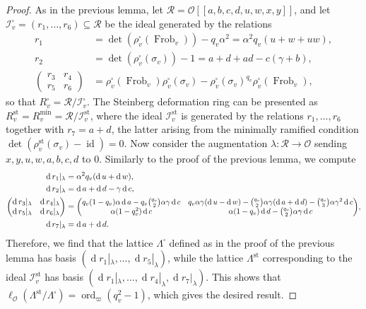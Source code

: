 \documentclass[a4paper, notitlepage, 10pt]{amsart}
\theoremstyle{plain} %
\theoremstyle{definition} %
\theoremstyle{remark} %
\numberwithin{equation}{section}
\newcommand{\dd}{\operatorname{d}} %
\newcommand{\Frob}{\operatorname{Frob}} %
\newcommand{\id}{\operatorname{id}} %
\newcommand{\ord}{\operatorname{ord}} %
\newcommand{\st}{\operatorname{st}}
\begin{document}
\begin{proof}
As in the previous lemma, let $\mathcal{R}=\mathcal{O}[[a,b,c,d,u,w,x,y]]$, and let $\mathcal{I}^\square_v=(r_1,\dots,r_6)\subseteq \mathcal{R}$ be the ideal generated by the relations    \begin{align*}
        r_1 &=\det(\rho_v^{\square}(\Frob_v))-q_v\alpha^2= \alpha^2q_v (u+w+uw),
        \\  r_2 &=\det(\rho_v^{\square}(\sigma_v))-1= a+d+ ad-c(\gamma+b),
        \\ \begin{pmatrix}
            r_3 & r_4
            \\ r_5 & r_6
        \end{pmatrix} &=\rho_v^{\square}(\Frob_v)\rho_v^{\square}(\sigma_v)-\rho_v^{\square}(\sigma_v)^{q_v} \rho_v^{\square}(\Frob_v),
    \end{align*}
    so that $R_v^\square= \mathcal{R}/\mathcal{I}^\square_v$. The Steinberg deformation ring can be presented as $R^{\st}_v=R^{\min}_v=\mathcal{R}/\mathcal{I}^{\st}_v$, where the ideal $\mathcal{I}^{\st}_v$ is generated by the relations $r_1,\dots,r_6$ together with $r_7=a+d$, the latter arising from the minimally ramified condition $\det(\rho^{\st}_v(\sigma_v)-\id)=0$.
    Now consider the augmentation $\lambda\colon \mathcal{R}\to \mathcal{O}$ sending $x,y,u,w,a,b,c,d$ to $0$. Similarly to the proof of the previous lemma, we compute
\begin{align*}
    \dd r_1|_\lambda &= \alpha^2 q_v (\dd u + \dd w),
    \\ \dd r_2|_\lambda &= \dd a+ \dd d -\gamma \dd c,
    \\ \begin{pmatrix}
        \dd r_3|_\lambda & \dd r_4|_\lambda
        \\ \dd r_5|_\lambda & \dd r_6|_\lambda
    \end{pmatrix} &= \scalebox{0.95}{$\begin{pmatrix}
        q_v(1-q_v)\alpha\dd a-q_v\tbinom{q_v}{2}\alpha\gamma \dd c 
        & q_v\alpha\gamma (\dd u-\dd w) -\tbinom{q_v}{2}\alpha\gamma (\dd a+\dd d) -\tbinom{q_v}{3}\alpha\gamma^2\dd c
        \\ \alpha(1-q_v^2) \dd c 
        & \alpha (1-q_v) \dd d-\tbinom{q_v}{2}\alpha\gamma\dd c
    \end{pmatrix}$}, 
    \\ \dd r_7|_\lambda &= \dd a+\dd d.
\end{align*}
    Therefore, we find that the lattice $\Lambda^{\square}$ defined as in the proof of the previous lemma has basis $(\dd r_1|_{\lambda},\dots,\dd r_5|_{\lambda})$, while the lattice $\Lambda^{\st}$ corresponding to the ideal $\mathcal{I}^{\st}_v$ has basis $ (\dd r_1|_{\lambda},\dots,\dd r_4|_{\lambda},\dd r_7|_{\lambda})$. This shows that $\ell_{\mathcal{O}}(\Lambda^{\st}/\Lambda^{\square})=\ord_{\varpi}(q_v^2-1)$, which gives the desired result.
\end{proof}
\end{document}
